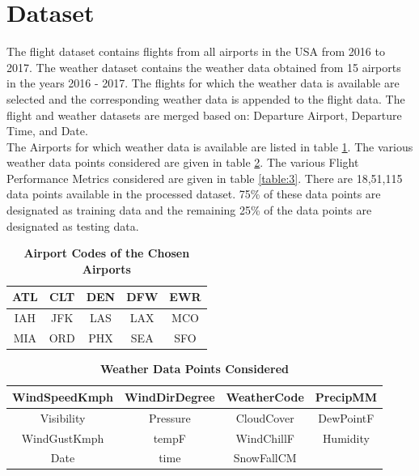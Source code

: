 \documentclass[12pt]{extarticle}
\begin{document}
\section{Dataset}
The flight dataset contains flights from all airports in the USA from 2016 to 2017. The weather dataset contains the weather data obtained from 15 airports in the years 2016 - 2017. The flights for which the weather data is available are selected and the corresponding weather data is appended to the flight data.
 The flight and weather datasets are  merged based on: Departure Airport, Departure Time, and Date.\\
 The Airports for which weather data is available are listed in table \ref{table:1}. The various weather data points considered are given in table \ref{table:2}. The various Flight Performance Metrics considered are given in table \ref{table:3}. There are 18,51,115 data points available in the processed dataset.
 75\% of these data points are designated as training data and the remaining 25\% of the data points are designated as testing data.
\vfill
{\renewcommand{\arraystretch}{1.5}%
\begin{table}[h]
    \centering
    \begin{tabular}{|c|c|c|c|c|}
    
    \hline
         ATL & CLT & DEN & DFW & EWR\\
    \hline
         IAH & JFK & LAS & LAX & MCO\\
    \hline
        MIA & ORD & PHX & SEA & SFO\\
    \hline
    \end{tabular}
    \caption{\textbf{Airport Codes of the Chosen Airports}}
    \label{table:1}
\end{table}
}
\vfill
{\renewcommand{\arraystretch}{1.5}%
\begin{table}[h]
    \centering
    \begin{tabular}{|c|c|c|c|}
    \hline
        WindSpeedKmph & WindDirDegree & WeatherCode & PrecipMM\\
    \hline
        Visibility & Pressure & CloudCover & DewPointF\\
    \hline
        WindGustKmph & tempF & WindChillF & Humidity\\
    \hline
        Date & time & SnowFallCM &\\
    \hline
    \end{tabular}
    \caption{\textbf{Weather Data Points Considered}}
    \label{table:2}
\end{table}
}
\end{document}
